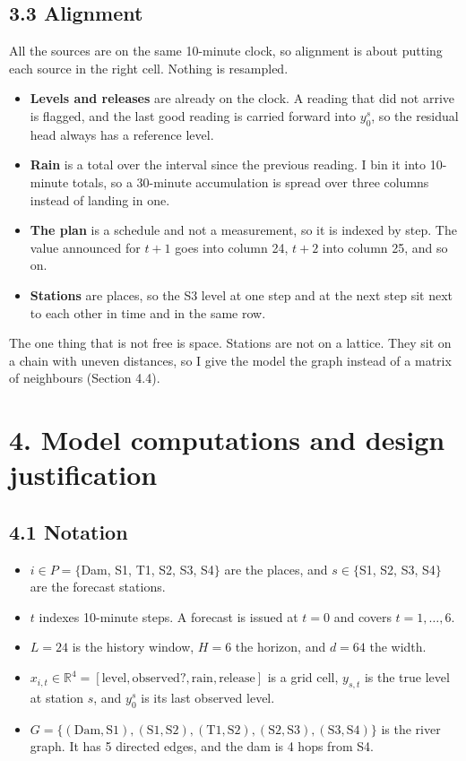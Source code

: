 \documentclass[11pt,letterpaper]{article}
\begin{document}
\subsection*{3.3 Alignment}

All the sources are on the same 10-minute clock, so alignment is about putting
each source in the right cell. Nothing is resampled.

\begin{itemize}
\item \textbf{Levels and releases} are already on the clock. A reading that did
not arrive is flagged, and the last good reading is carried forward into $y^s_0$,
so the residual head always has a reference level.
\item \textbf{Rain} is a total over the interval since the previous reading. I
bin it into 10-minute totals, so a 30-minute accumulation is spread over three
columns instead of landing in one.
\item \textbf{The plan} is a schedule and not a measurement, so it is indexed by
step. The value announced for $t{+}1$ goes into column 24, $t{+}2$ into column
25, and so on.
\item \textbf{Stations} are places, so the S3 level at one step and at the next
step sit next to each other in time and in the same row.
\end{itemize}

The one thing that is not free is space. Stations are not on a lattice. They sit
on a chain with uneven distances, so I give the model the graph instead of a
matrix of neighbours (Section 4.4).


\section*{4. Model computations and design justification}

\subsection*{4.1 Notation}

\begin{itemize}
\item $i \in P=\{$Dam, S1, T1, S2, S3, S4$\}$ are the places, and $s \in \{$S1, S2, S3, S4$\}$ are the forecast stations.
\item $t$ indexes 10-minute steps. A forecast is issued at $t=0$ and covers $t=1,\dots,6$.
\item $L=24$ is the history window, $H=6$ the horizon, and $d=64$ the width.
\item $x_{i,t}\in\mathbb{R}^4=[\text{level},\text{observed?},\text{rain},\text{release}]$ is a grid cell, $y_{s,t}$ is the true level at station $s$, and $y^s_0$ is its last observed level.
\item $G=\{(\text{Dam},\text{S1}),(\text{S1},\text{S2}),(\text{T1},\text{S2}),(\text{S2},\text{S3}),(\text{S3},\text{S4})\}$ is the river graph. It has 5 directed edges, and the dam is 4 hops from S4.
\end{itemize}
\end{document}
